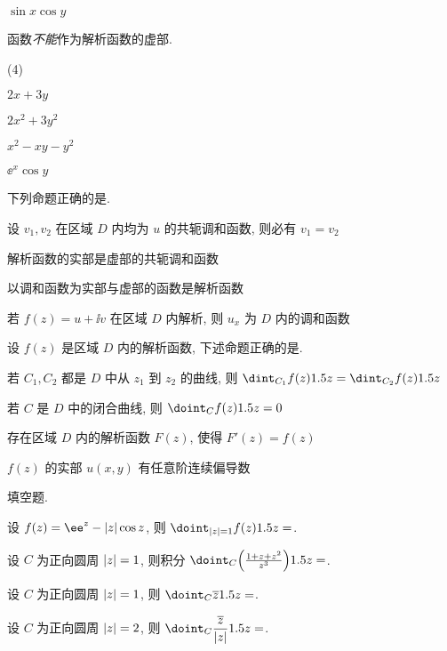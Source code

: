\begin{homework}
\begin{homework}
\begin{exchoice}
        \item $\sin x\cos y$
      \end{exchoice}
    \item 函数\fillbrace{}\emph{不能}作为解析函数的虚部.
      \begin{exchoice}(4)
        \item $2x+3y$
        \item $2x^2+3y^2$
        \item $x^2-xy-y^2$
        \item $\ee^x\cos y$
      \end{exchoice}
    \item 下列命题正确的是\fillbrace{}.
      \begin{exchoice}
        \item 设 $v_1,v_2$ 在区域 $D$ 内均为 $u$ 的共轭调和函数, 则必有 $v_1=v_2$
        \item 解析函数的实部是虚部的共轭调和函数
        \item 以调和函数为实部与虚部的函数是解析函数
        \item 若 $f(z)=u+\ii v$ 在区域 $D$ 内解析, 则 $u_x$ 为 $D$ 内的调和函数
      \end{exchoice}
    \item 设 $f(z)$ 是区域 $D$ 内的解析函数, 下述命题正确的是\fillbrace{}.
      \begin{exchoice}
        \item 若 $C_1,C_2$ 都是 $D$ 中从 $z_1$ 到 $z_2$ 的曲线, 则 $\dint_{C_1}f(z)\d z=\dint_{C_2}f(z)\d z$
        \item 若 $C$ 是 $D$ 中的闭合曲线, 则 $\doint_Cf(z)\d z=0$
        \item 存在区域 $D$ 内的解析函数 $F(z)$, 使得 $F'(z)=f(z)$
        \item $f(z)$ 的实部 $u(x,y)$ 有任意阶连续偏导数
      \end{exchoice}
  \end{homework}
  \item 填空题.
  \begin{homework}
    \item 设 $f(z)=\ee^z-\abs{z}\cos z$, 则 $\doint_{\abs{z}=1}f(z)\d z=$\fillblank{}.
    \item 设 $C$ 为正向圆周 $\left|z\right|=1$, 则积分 $\doint_C\Bigl(\frac{1+z+z^2}{z^3}\Bigr)\d z=$\fillblank{}.
    \item 设 $C$ 为正向圆周 $\left|z\right|=1$, 则 $\doint_C\ov z\d z=$\fillblank{}.
    \item 设 $C$ 为正向圆周 $\left|z\right|=2$, 则 $\doint_C\dfrac{\ov z}{\abs{z}}\d z=$\fillblank{}.

\end{homework}
\end{homework}
